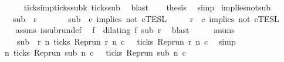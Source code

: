 \begin{isabellebody}
\ \ \ \ \isamarkupfalse%
\ ticks{\isacharunderscore}imp{\isacharunderscore}ticks{\isacharunderscore}subk\ ticks{\isacharunderscore}sub\ \isamarkupfalse%
\ blast\isanewline
\ \ \isamarkupfalse%
\ {\isacharquery}thesis\ \isamarkupfalse%
\ simp\isanewline
{}\isamarkupfalse%
%
\endisatagproof
{\isafoldproof}%
%
\isadelimproof
\isanewline
%
\endisadelimproof
\isanewline
{}\isamarkupfalse%
\ implies{\isacharunderscore}not{\isacharunderscore}sub{\isacharcolon}\isanewline
\ \ \ {\isacartoucheopen}sub\ {\isasymlless}\ r{\isacartoucheclose}\isanewline
\ \ \ \ \ \ \ {\isacartoucheopen}sub\ {\isasymin}\ {\isasymlbrakk}c\ implies\ not\ c\isactrlsub T\isactrlsub E\isactrlsub S\isactrlsub L{\isacartoucheclose}\isanewline
\ \ \ \ \ {\isacartoucheopen}r\ {\isasymin}\ {\isasymlbrakk}c\ implies\ not\ c\isactrlsub T\isactrlsub E\isactrlsub S\isactrlsub L{\isacartoucheclose}\isanewline
%
\isadelimproof
%
\endisadelimproof
%
\isatagproof
{}\isamarkupfalse%
\ {\isacharminus}\isanewline
\ \ \isamarkupfalse%
\ assms{\isacharparenleft}{}{\isacharparenright}\ is{\isacharunderscore}subrun{\isacharunderscore}def\ \isamarkupfalse%
\ f\ \ {\isacartoucheopen}dilating\ f\ sub\ r{\isacartoucheclose}\ \isamarkupfalse%
\ blast\isanewline
\ \ \isamarkupfalse%
\ \isamarkupfalse%
\ assms{\isacharparenleft}{}{\isacharparenright}\ \isamarkupfalse%
\isanewline
\ \ \ \ {\isacartoucheopen}sub\ {\isasymin}\ {\isacharbraceleft}r{\isachardot}\ {\isasymforall}n{\isachardot}\ ticks\ {\isacharparenleft}{\isacharparenleft}Rep{\isacharunderscore}run\ r{\isacharparenright}\ n\ c\ {\isasymlongrightarrow}\ {\isasymnot}\ ticks\ {\isacharparenleft}{\isacharparenleft}Rep{\isacharunderscore}run\ r{\isacharparenright}\ n\ c\ \isamarkupfalse%
\ simp\isanewline
\ \ \isamarkupfalse%
\ {\isacartoucheopen}{\isasymforall}n{\isachardot}\ ticks\ {\isacharparenleft}{\isacharparenleft}Rep{\isacharunderscore}run\ sub{\isacharparenright}\ n\ c\ {\isasymlongrightarrow}\ {\isasymnot}\ ticks\ {\isacharparenleft}{\isacharparenleft}Rep{\isacharunderscore}run\ sub{\isacharparenright}\ n\ c\ \isamarkupfalse%

\end{isabellebody}
